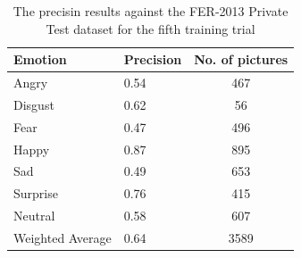 \documentclass[runningheads,a4paper,11pt]{report}
\begin{document}
\begin{table}[htbp]
	\caption{The precisin results against the FER-2013 Private Test dataset for the fifth training trial}
	\label{fer_training_28k_01_mean_square_private_test}
		\begin{center}
			\begin{tabular}{p{110pt}p{110pt}c}
				\textbf{Emotion}& \textbf{Precision}& \textbf{No. of pictures} \\
				\hline\hline
				Angry& 0.54& 467 \\
				Disgust& 0.62& 56 \\
				Fear& 0.47& 496 \\
				Happy& 0.87& 895 \\
				Sad& 0.49& 653 \\
				Surprise& 0.76& 415 \\
				Neutral& 0.58& 607 \\
				\hline
				Weighted Average& 0.64 &3589
			\end{tabular}
		\end{center}
\end{table}
\end{document}
